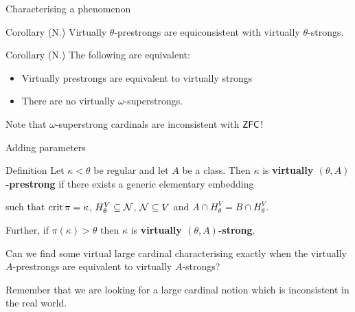 \begin{frame}{Characterising a phenomenon}
  \begin{block}{Corollary (N.)}
    Virtually $\theta$-prestrongs are equiconsistent with virtually $\theta$-strongs.
  \end{block}

  \pause

  \begin{block}{Corollary (N.)}
    The following are equivalent:
    \begin{itemize}
      \item Virtually prestrongs are equivalent to virtually strongs
      \item There are no virtually $\omega$-superstrongs.
    \end{itemize}
  \end{block}

  \pause

  Note that $\omega$-superstrong cardinals are inconsistent with $\textsf{ZFC}$!
\end{frame}

\begin{frame}{Adding parameters}
  \begin{block}{Definition}
    Let $\kappa<\theta$ be regular and let $A$ be a class. Then $\kappa$ is \textbf{virtually $(\theta,A)$-prestrong} if there exists a generic elementary embedding

    such that $\operatorname{crit}\pi=\kappa$, $H_\theta^V\subseteq\operatorname{\mathcal N}$, $\operatorname{\mathcal N}\subseteq V$ and $A\cap H_\theta^V=B\cap H_\theta^V$.

    \qquad Further, if $\pi(\kappa)>\theta$ then $\kappa$ is \textbf{virtually $(\theta,A)$-strong}.
  \end{block}

  \pause
  
  Can we find some virtual large cardinal characterising exactly when the virtually $A$-prestrongs are equivalent to virtually $A$-strongs?

  \pause

  Remember that we are looking for a large cardinal notion which is inconsistent in the real world.
\end{frame}

